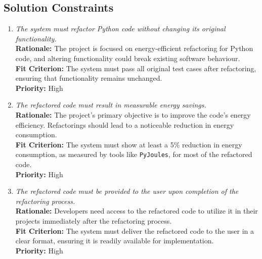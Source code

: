\documentclass[12pt]{article}
\begin{document}
\subsection{Solution Constraints}
\begin{enumerate}[label=SC \arabic*., wide=0pt, leftmargin=*]
    \item \emph{The system must refactor Python code without changing its original functionality.}\\
    {\bf Rationale:} The project is focused on energy-efficient refactoring for Python code, and altering functionality could break existing software behaviour.\\
    {\bf Fit Criterion:} The system must pass all original test cases after refactoring, ensuring that functionality remains unchanged.\\
    {\bf Priority:} High
    \item \emph{The refactored code must result in measurable energy savings.}\\
    {\bf Rationale:} The project's primary objective is to improve the code's energy efficiency. Refactorings should lead to a noticeable reduction in energy consumption.\\
    {\bf Fit Criterion:} The system must show at least a 5\% reduction in energy consumption, as measured by tools like \texttt{PyJoules}, for most of the refactored code.\\
    {\bf Priority:} High
    \item \emph{The refactored code must be provided to the user upon completion of the refactoring process.}\\
    {\bf Rationale:} Developers need access to the refactored code to utilize it in their projects immediately after the refactoring process.\\
    {\bf Fit Criterion:} The system must deliver the refactored code to the user in a clear format, ensuring it is readily available for implementation.\\
    {\bf Priority:} High
\end{enumerate}
\end{document}
